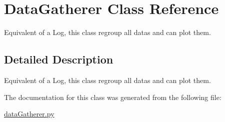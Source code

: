 \hypertarget{classDataGatherer}{}\section{Data\+Gatherer Class Reference}
\label{classDataGatherer}


Equivalent of a Log, this class regroup all datas and can plot them.  




\subsection{Detailed Description}
Equivalent of a Log, this class regroup all datas and can plot them. 

The documentation for this class was generated from the following file\+:\begin{DoxyCompactItemize}
\item 
\hyperlink{dataGatherer_8py}{data\+Gatherer.\+py}\end{DoxyCompactItemize}
